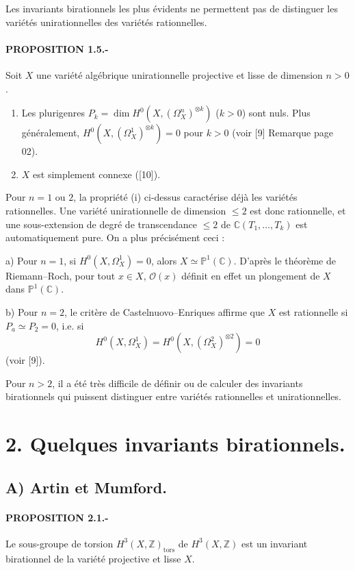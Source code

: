 \documentclass[10pt]{article}
\newcommand{\C}{\mathbb C}
\newcommand{\PP}{\mathbb P}
\newcommand{\ZZ}{\mathbb Z}
\newcommand{\OO}{\mathcal O}
\newcommand{\tors}{\mathrm{tors}}
\begin{document}
Les invariants birationnels les plus évidents ne permettent pas de distinguer les variétés unirationnelles des variétés rationnelles.

\paragraph{PROPOSITION 1.5.-} Soit \(X\) une variété algébrique unirationnelle projective et lisse de dimension \(n>0\).
\begin{enumerate}[label=(\roman*)]
  \item Les plurigenres \(P_k=\dim H^0(X,(\Omega_X^n)^{\otimes k})\) (\(k>0\)) sont nuls. Plus généralement, \(H^0(X,(\Omega_X^1)^{\otimes k})=0\) pour \(k>0\) (voir [9] Remarque page 02).
  \item \(X\) est simplement connexe ([10]).
\end{enumerate}

Pour \(n=1\) ou \(2\), la propriété (i) ci-dessus caractérise déjà les variétés rationnelles. Une variété unirationnelle de dimension \(\leq2\) est donc rationnelle, et une sous-extension de degré de transcendance \(\leq2\) de \(\C(T_1,\ldots,T_k)\) est automatiquement pure. On a plus précisément ceci :

\noindent a) Pour \(n=1\), si \(H^0(X,\Omega_X^1)=0\), alors \(X\simeq\PP^1(\C)\). D'après le théorème de Riemann--Roch, pour tout \(x\in X\), \(\OO(x)\) définit en effet un plongement de \(X\) dans \(\PP^1(\C)\).

\newpage
\noindent b) Pour \(n=2\), le critère de Castelnuovo--Enriques affirme que \(X\) est rationnelle si \(P_a\simeq P_2=0\), i.e. si
\[
  H^0(X,\Omega_X^1)=H^0(X,(\Omega_X^2)^{\otimes2})=0
\]
(voir [9]).

Pour \(n>2\), il a été très difficile de définir ou de calculer des invariants birationnels qui puissent distinguer entre variétés rationnelles et unirationnelles.

\section*{2. Quelques invariants birationnels.}

\subsection*{A) Artin et Mumford.}

\paragraph{PROPOSITION 2.1.-} Le sous-groupe de torsion \(H^3(X,\ZZ)_{\tors}\) de \(H^3(X,\ZZ)\) est un invariant birationnel de la variété projective et lisse \(X\).
\end{document}
